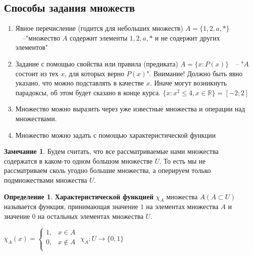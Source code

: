 \documentclass[12pt,oneside]{article}
\theoremstyle{definition}
\newtheorem{definition}{Определение}
\newtheorem{remark}{Замечание}[section]
\begin{document}
\subsection{Способы задания множеств}
\begin{enumerate}
    \item Явное перечисление (годится для небольших множеств)\newline
        $A = \{1, 2, a, *\}$\ \ \---"множество $A$ содержит элементы $1, 2, a, *$ и не содержит других элементов"
        
    \item Задание с помощью свойства или правила (предиката)\newline
        $A=\{x: P(x)\}$\ \ \--- "$A$ состоит из тех $x$, для которых верно $P(x)$".  Внимание! Должно быть явно указано, что можно подставлять в качестве $x$. Иначе могут возникнуть парадоксы, об этом будет сказано в конце курса. \newline
        $\{x: x^2\leq 4, x\in \mathbb{R} \} = [-2; 2]$
    \item Множество можно выразить через уже известные множества и операции над множествами.
    \item Множество можно задать с помощью характеристической функции
\end{enumerate}
\begin{remark}
    Будем считать, что все рассматриваемые нами множества содержатся в каком-то одном большом множестве $U$. То есть мы не рассматриваем сколь угодно большие множества, а оперируем только подмножествами множества $U$.
    \end{remark}
\begin{definition} \label{Char_f}
\textbf{Характеристической функцией} $\chi_{A}$ множества $A (A\subset U)$ называется функция, принимающая значение $1$ на элементах множества $A$ и значение $0$ на остальных элементах множества $U$.
\end{definition}
$\chi_{A}(x) =
        \begin{cases} 
        1, & x\in A \\
        0, & x\not\in A \\
        \end{cases} $
\newline \newline
$\chi_{A}: U \longrightarrow \{0, 1\} $
\newline
\end{document}
